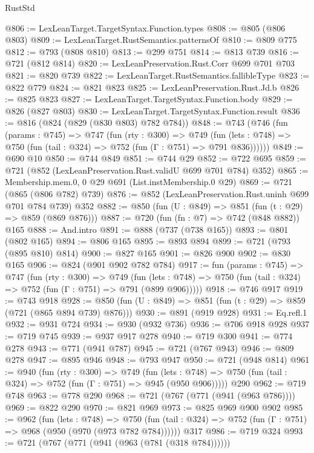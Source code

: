 \begin{lexlean}{RustStd}
\begin{coremodule}
@806 := LexLeanTarget.TargetSyntax.Function.types
@808 := @805 (@806 @803)
@809 := LexLeanTarget.RustSemantics.patternsOf
@810 := @809 @775
@812 := @793 (@808 @810)
@813 := @299 @751
@814 := @813 @739
@816 := @721 (@812 @814)
@820 := LexLeanPreservation.Rust.Corr @699 @701 @703
@821 := @820 @739
@822 := LexLeanTarget.RustSemantics.fallibleType
@823 := @822 @779
@824 := @821 @823
@825 := LexLeanPreservation.Rust.Jd.b
@826 := @825 @823
@827 := LexLeanTarget.TargetSyntax.Function.body
@829 := @826 (@827 @803)
@830 := LexLeanTarget.TargetSyntax.Function.result
@836 := @816 (@824 (@829 (@830 @803) @782 @784))
@848 := @743
    (@746
      (fun (params : @745) =>
      @747
        (fun (rty : @300) =>
        @749
          (fun (lets : @748) => @750 (fun (tail : @324) => @752 (fun (Γ : @751) => @791 @836))))))
@849 := @690 @10
@850 := @744 @849
@851 := @744 @29
@852 := @722 @695
@859 := @721 (@852 (LexLeanPreservation.Rust.validU @699 @701 @784) @352)
@865 := Membership.mem.{0, 0} @29 @691 (List.instMembership.{0} @29)
@869 := @721 (@865 (@806 @782) @739)
@876 := @852 (LexLeanPreservation.Rust.uninh @699 @701 @784 @739) @352
@882 := @850 (fun (U : @849) => @851 (fun (t : @29) => @859 (@869 @876)))
@887 := @720 (fun (fn : @7) => @742 (@848 @882)) @165
@888 := And.intro
@891 := @888 (@737 (@738 @165))
@893 := @801 (@802 @165)
@894 := @806 @165
@895 := @893 @894
@899 := @721 (@793 (@895 @810) @814)
@900 := @827 @165
@901 := @826 @900
@902 := @830 @165
@906 := @824 (@901 @902 @782 @784)
@917 := fun (params : @745) =>
  @747
    (fun (rty : @300) =>
    @749
      (fun (lets : @748) => @750 (fun (tail : @324) => @752 (fun (Γ : @751) => @791 (@899 @906)))))
@918 := @746 @917
@919 := @743 @918
@928 := @850 (fun (U : @849) => @851 (fun (t : @29) => @859 (@721 (@865 @894 @739) @876)))
@930 := @891 (@919 @928)
@931 := Eq.refl.{1}
@932 := @931 @724
@934 := @930 (@932 @736)
@936 := @706 @918 @928
@937 := @719 @745
@939 := @937 @917 @278
@940 := @719 @300
@941 := @774 @278
@943 := @771 (@941 @787)
@945 := @721 (@767 @943)
@946 := @809 @278
@947 := @895 @946
@948 := @793 @947
@950 := @721 (@948 @814)
@961 := @940
    (fun (rty : @300) =>
    @749
      (fun (lets : @748) => @750 (fun (tail : @324) => @752 (fun (Γ : @751) => @945 (@950 @906)))))
    @290
@962 := @719 @748
@963 := @778 @290
@968 := @721 (@767 (@771 (@941 (@963 @786))))
@969 := @822 @290
@970 := @821 @969
@973 := @825 @969 @900 @902
@985 := @962
    (fun (lets : @748) =>
    @750 (fun (tail : @324) => @752 (fun (Γ : @751) => @968 (@950 (@970 (@973 @782 @784))))))
    @317
@986 := @719 @324
@993 := @721 (@767 (@771 (@941 (@963 (@781 (@318 @784))))))

\end{coremodule}
\end{lexlean}
